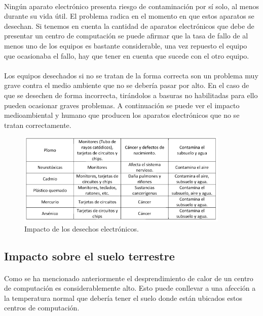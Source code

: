 \documentclass[12pt]{article}
\begin{document}
        	\paragraph{}
            Ningún aparato electrónico presenta riesgo de contaminación por sí solo, al menos durante su vida útil. El problema radica en el momento en que estos aparatos se desechan. Si tenemos en cuenta la cantidad de aparatos electrónicos que debe de presentar un centro de computación se puede afirmar que la tasa de fallo de al menos uno de los equipos es bastante considerable, una vez repuesto el equipo que ocasionaba el fallo, hay que tener en cuenta que sucede con el otro equipo. 
            \paragraph{}
            Los equipos desechados si no se tratan de la forma correcta son un problema muy grave contra el medio ambiente que no se debería pasar por alto. En el caso de que se desechen de forma incorrecta, tirándolos a basuras no habilitadas para ello pueden ocasionar graves problemas. A continuación se puede ver el impacto medioambiental y humano que producen los aparatos electrónicos que no se tratan correctamente.
            
           \begin{figure}[htpb!]
				\begin{center}
					\includegraphics[width=0.9\textwidth]{desechoE}
					\caption{Impacto de los desechos electrónicos.\cite{J.rocha: i-medioAmbiente}}
					\label{image:desechoE.png}
				\end{center}
		\end{figure} 
        
        
        
	  \subsection{Impacto sobre el suelo terrestre}
	  	\paragraph{}
		Como se ha mencionado anteriormente el desprendimiento de calor de un centro de computación es considerablemente alto. Esto puede conllevar a una afección a la temperatura normal que debería tener el suelo donde están ubicados estos centros de computación.
        
\end{document}
